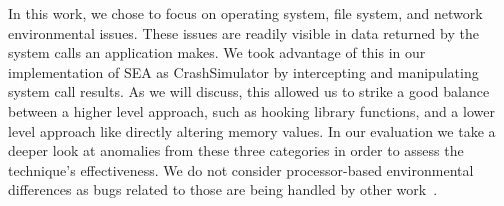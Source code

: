 In this work, we chose to focus on operating system,
file system, and network
environmental issues.
These issues are
readily visible in data returned
by the system calls
an application makes.
We took advantage of this in our implementation of SEA as CrashSimulator by
intercepting and manipulating system call results.
As we will discuss, this allowed us to strike a good balance between a
higher level approach, such as hooking library functions, and a lower level
approach like directly altering memory values.
In our evaluation we take a deeper look at anomalies from
these three categories in order to assess the technique's effectiveness.
We do not consider processor-based environmental differences as bugs related to those are being handled by other
work~\cite{Alglave:2018:FSC:3173162.3177156}.
